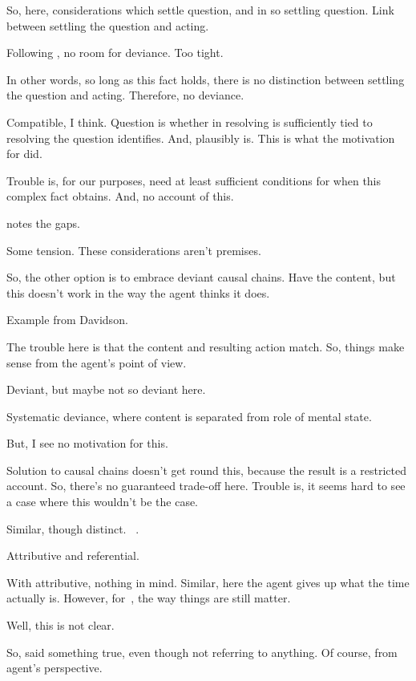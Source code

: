 \begin{note}
  So, here, considerations which settle question, and in so settling question.
  Link between settling the question and acting.

  Following \citeauthor{Hieronymi:2011aa}, no room for deviance.
  Too tight.

  In other words, so long as this fact holds, there is no distinction between settling the question and acting.
  Therefore, no deviance.

  Compatible, I think.
  Question is whether in resolving \qzS{} is sufficiently tied to resolving the question \citeauthor{Hieronymi:2011aa} identifies.
  And, plausibly is.
  This is what the motivation for \qzS{} did.

  Trouble is, for our purposes, need at least sufficient conditions for when this complex fact obtains.
  And, no account of this.

  \citeauthor{Hieronymi:2011aa} notes the gaps.

  Some tension.
  These considerations aren't premises.
\end{note}

\begin{note}
  So, the other option is to embrace deviant causal chains.
  Have the content, but this doesn't work in the way the agent thinks it does.

  Example from Davidson.

  The trouble here is that the content and resulting action match.
  So, things make sense from the agent's point of view.

  Deviant, but maybe not so deviant here.

  Systematic deviance, where content is separated from role of mental state.

  But, I see no motivation for this.

  Solution to causal chains doesn't get round this, because the result is a restricted account.
  So, there's no guaranteed trade-off here.
  Trouble is, it seems hard to see a case where this wouldn't be the case.
\end{note}

\begin{note}
  Similar, though distinct.
  ~\cite{Donnellan:1966wt}.

  Attributive and referential.

  With attributive, nothing in mind.
  Similar, here the agent gives up what the time actually is.
  However, for~\citeauthor{Donnellan:1966wt}, the way things are still matter.

  Well, this is not clear.

  So, said something true, even though not referring to anything.
  Of course, from agent's perspective.
\end{note}

